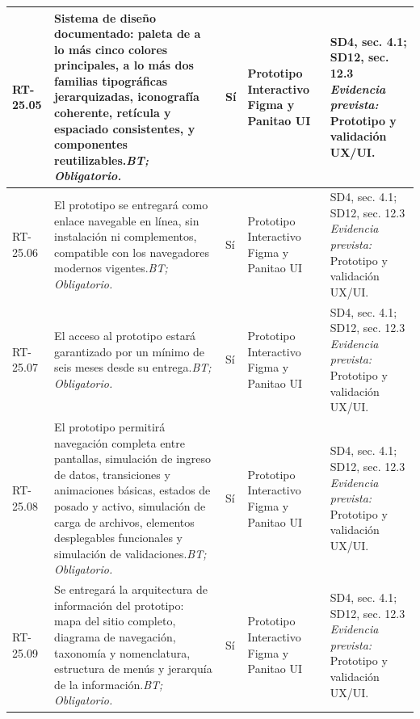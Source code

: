 \begin{paginaHorizontalSynaptix}
\begin{longtable}{|L{0.09\AnchoMatrizTDoce}|L{0.385\AnchoMatrizTDoce}|L{0.065\AnchoMatrizTDoce}|L{0.18\AnchoMatrizTDoce}|L{0.28\AnchoMatrizTDoce}|}
RT-\allowbreak{}25.\allowbreak{}05 &
Sistema de diseño documentado: paleta de a lo más cinco colores principales, a lo más dos familias tipográficas jerarquizadas, iconografía coherente, retícula y espaciado consistentes, y componentes reutilizables.\newline\textit{BT; Obligatorio.} &
Sí &
Prototipo Interactivo Figma y Panitao UI &
SD4, sec. 4.1; SD12, sec. 12.3 \newline\textit{Evidencia prevista:} Prototipo y validación UX/UI. \\ \hline

RT-\allowbreak{}25.\allowbreak{}06 &
El prototipo se entregará como enlace navegable en línea, sin instalación ni complementos, compatible con los navegadores modernos vigentes.\newline\textit{BT; Obligatorio.} &
Sí &
Prototipo Interactivo Figma y Panitao UI &
SD4, sec. 4.1; SD12, sec. 12.3 \newline\textit{Evidencia prevista:} Prototipo y validación UX/UI. \\ \hline

RT-\allowbreak{}25.\allowbreak{}07 &
El acceso al prototipo estará garantizado por un mínimo de seis meses desde su entrega.\newline\textit{BT; Obligatorio.} &
Sí &
Prototipo Interactivo Figma y Panitao UI &
SD4, sec. 4.1; SD12, sec. 12.3 \newline\textit{Evidencia prevista:} Prototipo y validación UX/UI. \\ \hline

RT-\allowbreak{}25.\allowbreak{}08 &
El prototipo permitirá navegación completa entre pantallas, simulación de ingreso de datos, transiciones y animaciones básicas, estados de posado y activo, simulación de carga de archivos, elementos desplegables funcionales y simulación de validaciones.\newline\textit{BT; Obligatorio.} &
Sí &
Prototipo Interactivo Figma y Panitao UI &
SD4, sec. 4.1; SD12, sec. 12.3 \newline\textit{Evidencia prevista:} Prototipo y validación UX/UI. \\ \hline

RT-\allowbreak{}25.\allowbreak{}09 &
Se entregará la arquitectura de información del prototipo: mapa del sitio completo, diagrama de navegación, taxonomía y nomenclatura, estructura de menús y jerarquía de la información.\newline\textit{BT; Obligatorio.} &
Sí &
Prototipo Interactivo Figma y Panitao UI &
SD4, sec. 4.1; SD12, sec. 12.3 \newline\textit{Evidencia prevista:} Prototipo y validación UX/UI. \\ \hline


\end{longtable}
\end{paginaHorizontalSynaptix}
